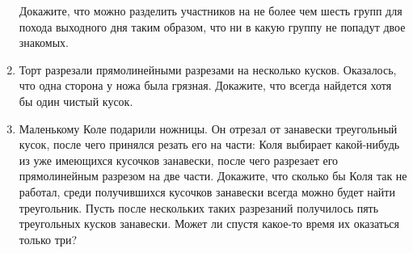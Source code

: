\begin{enumerate}
Докажите, что можно разделить участников на не более чем шесть групп для похода выходного дня таким
образом, что ни в какую группу не попадут двое знакомых.
\item Торт разрезали прямолинейными разрезами на несколько кусков. Оказалось, что одна сторона у
ножа была грязная. Докажите, что всегда найдется хотя бы один чистый кусок.
\item Маленькому Коле подарили ножницы. Он отрезал от занавески треугольный кусок, после чего
принялся резать его на части: Коля выбирает какой-нибудь из уже имеющихся кусочков занавески, после
чего разрезает его прямолинейным разрезом на две части. Докажите, что сколько бы Коля так не
работал, среди получившихся кусочков занавески всегда можно будет найти треугольник. Пусть после
нескольких таких разрезаний получилось пять треугольных кусков занавески. Может ли спустя какое-то
время их оказаться только три?
\end{enumerate}
